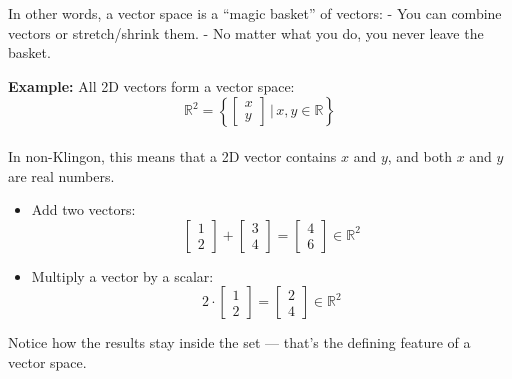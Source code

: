 \documentclass[12pt]{report}
\begin{document}
            In other words, a vector space is a “magic basket” of vectors:  
                - You can combine vectors or stretch/shrink them.  
                - No matter what you do, you never leave the basket.

            \textbf{Example:} All 2D vectors form a vector space:
            \begin{equation}
                \mathbb{R}^2 = \left\{ \begin{bmatrix}x \\ y\end{bmatrix} \,\bigg|\, x, y \in \mathbb{R} \right\}
            \end{equation} \\

            In non-Klingon, this means that a 2D vector contains $x$ and $y$, and both $x$ and $y$ are real numbers.

            \begin{itemize}
                \item Add two vectors: \\
                \begin{equation}
                    \begin{bmatrix}1 \\ 2 \end{bmatrix} + \begin{bmatrix}3 \\ 4 \end{bmatrix} =         \begin{bmatrix}4 \\ 6 \end{bmatrix} \in \mathbb{R}^2
                \end{equation}
                
                \item Multiply a vector by a scalar: \\
                \begin{equation}
                    2 \cdot \begin{bmatrix}1 \\ 2 \end{bmatrix} =      \begin{bmatrix}2 \\ 4 \end{bmatrix} \in \mathbb{R}^2
                \end{equation}
            \end{itemize}

            Notice how the results stay inside the set — that’s the defining feature of a vector space.
\end{document}
